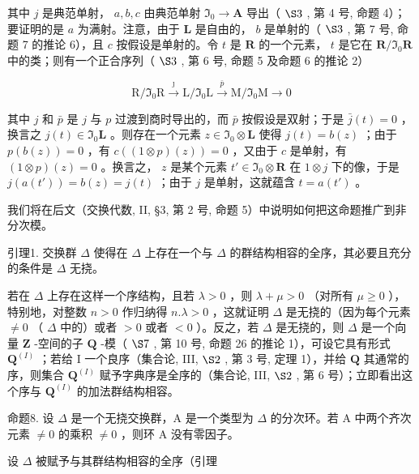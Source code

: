 其中 \(j\) 是典范单射， \(a, b, c\) 由典范单射 \(\mathfrak{I}_0 \to \mathbf{A}\) 导出（ \(\S 3\) , 第 4 号, 命题 4）；要证明的是 \(a\) 为满射。注意，由于 \(\mathbf{L}\) 是自由的， \(b\) 是单射的（ \(\S 3\) , 第 7 号, 命题 7 的推论 6），且 \(c\) 按假设是单射的。令 \(t\) 是 \(\mathbf{R}\) 的一个元素， \(t\) 是它在 \(\mathbf{R} / \mathfrak{I}_0\mathbf{R}\) 中的类；则有一个正合序列（ \(\S 3\) , 第 6 号, 命题 5 及命题 6 的推论 2）

\[
\mathrm{R} / \mathfrak {I} _ {0} \mathrm{R} \xrightarrow {\jmath} \mathrm{L} / \mathfrak {I} _ {0} \mathrm{L} \xrightarrow {\bar {p}} \mathrm{M} / \mathfrak {I} _ {0} \mathrm{M} \longrightarrow 0
\]

其中 \(j\) 和 \(\bar{p}\) 是 \(j\) 与 \(p\) 过渡到商时导出的，而 \(\bar{p}\) 按假设是双射；于是 \(\bar{j}(t) = 0\) ，换言之 \(j(t) \in \mathfrak{I}_0\mathbf{L}\) 。则存在一个元素 \(z \in \mathfrak{I}_0 \otimes \mathbf{L}\) 使得 \(j(t) = b(z)\) ；由于 \(p(b(z)) = 0\) ，有 \(c((1 \otimes p)(z)) = 0\) ，又由于 \(c\) 是单射，有 \((1 \otimes p)(z) = 0\) 。换言之， \(z\) 是某个元素 \(t' \in \mathfrak{I}_0 \otimes \mathbf{R}\) 在 \(1 \otimes j\) 下的像，于是 \(j(a(t')) = b(z) = j(t)\) ；由于 \(j\) 是单射，这就蕴含 \(t = a(t')\) 。

我们将在后文（交换代数, II, §3, 第 2 号, 命题 5）中说明如何把这命题推广到非分次模。

引理1. 交换群 \(\Delta\) 使得在 \(\Delta\) 上存在一个与 \(\Delta\) 的群结构相容的全序，其必要且充分的条件是 \(\Delta\) 无挠。

若在 \(\Delta\) 上存在这样一个序结构，且若 \(\lambda > 0\) ，则 \(\lambda + \mu > 0\) （对所有 \(\mu \geqslant 0\) ），特别地，对整数 \(n > 0\) 作归纳得 \(n.\lambda > 0\) ，这就证明 \(\Delta\) 是无挠的（因为每个元素 \(\neq 0\) （ \(\Delta\) 中的）或者 \(>0\) 或者 \(< 0\) ）。反之，若 \(\Delta\) 是无挠的，则 \(\Delta\) 是一个向量 \(\mathbf{Z}\) -空间的子 \(\mathbf{Q}\) -模（ \(\S 7\) , 第 10 号, 命题 26 的推论 1），可设它具有形式 \(\mathbf{Q}^{(I)}\) ；若给 I 一个良序（集合论, III, \(\S 2\) , 第 3 号, 定理 1），并给 \(\mathbf{Q}\) 其通常的序，则集合 \(\mathbf{Q}^{(I)}\) 赋予字典序是全序的（集合论, III, \(\S 2\) , 第 6 号）；立即看出这个序与 \(\mathbf{Q}^{(I)}\) 的加法群结构相容。

命题8. 设 \(\Delta\) 是一个无挠交换群，A 是一个类型为 \(\Delta\) 的分次环。若 A 中两个齐次元素 \(\neq 0\) 的乘积 \(\neq 0\) ，则环 A 没有零因子。

设 \(\Delta\) 被赋予与其群结构相容的全序（引理

